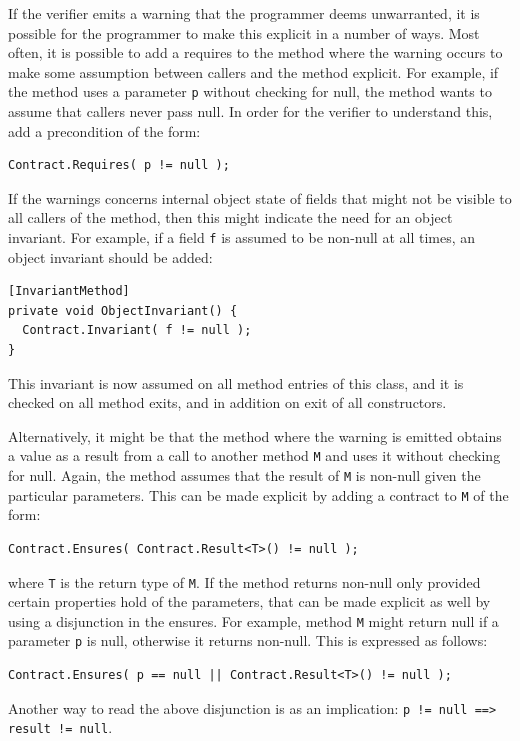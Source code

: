 \documentclass{article}
\newcommand{\code}[1]{\lstinline{#1}}
\begin{document}
If the verifier emits a warning that the programmer deems unwarranted,
it is possible for the programmer to make this explicit in a number of
ways. Most often, it is possible to add a requires to the method where
the warning occurs to make some assumption between callers and the
method explicit. For example, if the method uses a parameter \code{p} without checking for null, the method wants to assume that callers never pass null. In order for the verifier to understand this, add a precondition of the form:
\begin{lstlisting}
Contract.Requires( p != null );
\end{lstlisting}
If the warnings concerns internal object state of fields that might
not be visible to all callers of the method, then this might indicate
the need for an object invariant. For example, if a field \code{f} is
assumed to be non-null at all times, an object invariant should be
added:
\begin{lstlisting}
[InvariantMethod]
private void ObjectInvariant() {
  Contract.Invariant( f != null );
}
\end{lstlisting}
This invariant is now assumed on all method entries of this class, and
it is checked on all method exits, and in addition on exit of all
constructors.

Alternatively, it might be that the method where the warning is
emitted obtains a value as a result from a call to another method
\code{M} and uses it without checking for null. Again, the method
assumes that the result of \code{M} is non-null given the particular
parameters. This can be made explicit by adding a contract to \code{M}
of the form:
\begin{lstlisting}
Contract.Ensures( Contract.Result<T>() != null );
\end{lstlisting}
where \code{T} is the return type of \code{M}. If the method returns
non-null only provided certain properties hold of the parameters, that
can be made explicit as well by using a disjunction in the
ensures. For example, method \code{M} might return null if a parameter
\code{p} is null, otherwise it returns non-null. This is expressed
as follows:
\begin{lstlisting}
Contract.Ensures( p == null || Contract.Result<T>() != null );
\end{lstlisting}
Another way to read the above disjunction is as an implication: \code{p != null ==> result != null}.
\end{document}
